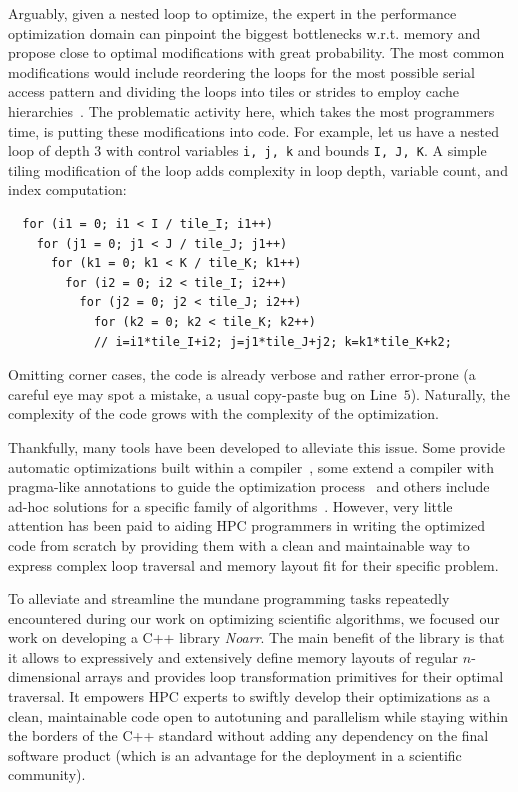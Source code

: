 Arguably, given a nested loop to optimize, the expert in the performance optimization domain can pinpoint the biggest bottlenecks w.r.t. memory and propose close to optimal modifications with great probability. The most common modifications would include reordering the loops for the most possible serial access pattern and dividing the loops into tiles or strides to employ cache hierarchies~\cite{wolf1991data}. The problematic activity here, which takes the most programmers time, is putting these modifications into code. For example, let us have a nested loop of depth 3 with control variables \texttt{i, j, k} and bounds \texttt{I, J, K}. A simple tiling modification of the loop adds complexity in loop depth, variable count, and index computation:
\begin{verbatim}
  for (i1 = 0; i1 < I / tile_I; i1++)
    for (j1 = 0; j1 < J / tile_J; j1++)
      for (k1 = 0; k1 < K / tile_K; k1++)
        for (i2 = 0; i2 < tile_I; i2++)
          for (j2 = 0; j2 < tile_J; i2++)
            for (k2 = 0; k2 < tile_K; k2++)
            // i=i1*tile_I+i2; j=j1*tile_J+j2; k=k1*tile_K+k2;
\end{verbatim}
Omitting corner cases, the code is already verbose and rather error-prone (a careful eye may spot a mistake, a usual copy-paste bug on Line~$5$).
Naturally, the complexity of the code grows with the complexity of the optimization.

Thankfully, many tools have been developed to alleviate this issue. Some provide automatic optimizations built within a compiler~\cite{trifunovic2010graphite,grosser2012polly}, some extend a compiler with pragma-like annotations to guide the optimization process~\cite{donadio2005language,yi2007poet,chen2008chill,namjoshi2016loopy} and others include ad-hoc solutions for a specific family of algorithms~\cite{9485033,AFANASYEV2021100707}. However, very little attention has been paid to aiding HPC programmers in writing the optimized code from scratch by providing them with a clean and maintainable way to express complex loop traversal and memory layout fit for their specific problem.

To alleviate and streamline the mundane programming tasks repeatedly encountered during our work on optimizing scientific algorithms, we focused our work on developing a C++ library \emph{Noarr}. The main benefit of the library is that it allows to expressively and extensively define memory layouts of regular $n$-dimensional arrays and provides loop transformation primitives for their optimal traversal. It empowers HPC experts to swiftly develop their optimizations as a clean, maintainable code open to autotuning and parallelism while staying within the borders of the C++ standard without adding any dependency on the final software product (which is an advantage for the deployment in a scientific community).

